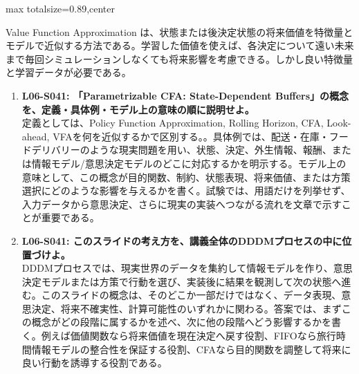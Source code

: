 \begin{minipage}[t]{0.58\textwidth}
\begin{adjustbox}{max totalsize={\textwidth}{0.89\textheight},center}
\begin{minipage}{\textwidth}
Value Function Approximation は、状態または後決定状態の将来価値を特徴量とモデルで近似する方法である。学習した価値を使えば、各決定について遠い未来まで毎回シミュレーションしなくても将来影響を考慮できる。しかし良い特徴量と学習データが必要である。\par{}\begin{enumerate}\item \textbf{L06-S041: 「Parametrizable CFA: State-Dependent Buffers」の概念を、定義・具体例・モデル上の意味の順に説明せよ。}\\定義としては、Policy Function Approximation, Rolling Horizon, CFA, Look-ahead, VFAを何を近似するかで区別する。。具体例では、配送・在庫・フードデリバリーのような現実問題を用い、状態、決定、外生情報、報酬、または情報モデル/意思決定モデルのどこに対応するかを明示する。モデル上の意味として、この概念が目的関数、制約、状態表現、将来価値、または方策選択にどのような影響を与えるかを書く。試験では、用語だけを列挙せず、入力データから意思決定、さらに現実の実装へつながる流れを文章で示すことが重要である。\item \textbf{L06-S041: このスライドの考え方を、講義全体のDDDMプロセスの中に位置づけよ。}\\DDDMプロセスでは、現実世界のデータを集約して情報モデルを作り、意思決定モデルまたは方策で行動を選び、実装後に結果を観測して次の状態へ進む。このスライドの概念は、そのどこか一部だけではなく、データ表現、意思決定、将来不確実性、計算可能性のいずれかに関わる。答案では、まずこの概念がどの段階に属するかを述べ、次に他の段階へどう影響するかを書く。例えば価値関数なら将来価値を現在決定へ戻す役割、FIFOなら旅行時間情報モデルの整合性を保証する役割、CFAなら目的関数を調整して将来に良い行動を誘導する役割である。\end{enumerate}
\end{minipage}
\end{adjustbox}
\end{minipage}



